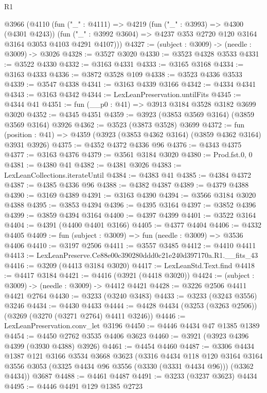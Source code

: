 \begin{lexlean}{R1}
\begin{coremodule}
  @3966
    (@4110
      (fun ("_" : @4111) =>
      @4219
        (fun ("_" : @3993) => @4300 (@4301 @4243))
        (fun ("_" : @3992 @3604) => @4237 @353 @2720 @120 @3164 @3164 @3053 @4103 @4291 @4107)))
@4327 := (subject : @3009) -> (needle : @3009) -> @3026
@4328 := @3527 @3020
@4330 := @3523 @4328 @3533
@4331 := @3522 @4330
@4332 := @3163 @4331
@4333 := @3165 @3168
@4334 := @3163 @4333
@4336 := @3872 @3528 @109
@4338 := @3523 @4336 @3533
@4339 := @3547 @4338
@4341 := @3163 @4339 @3166
@4342 := @4334 @4341
@4343 := @3163 @4342
@4344 := LexLeanPreservation.untilFits
@4345 := @4344 @41
@4351 := fun (__p0 : @41) => @3913 @3184 @3528 @3182 @3699 @3020
@4352 := @4345 @4351
@4359 := @3923 (@3853 @3569 @3164) (@3859 @3569 @3164) @3926
@4362 := @3523 (@3873 @3528) @3699
@4372 := fun (position : @41) => @4359 (@3923 (@3853 @4362 @3164) (@3859 @4362 @3164) @3931 @3926)
@4375 := @4352 @4372 @4336 @96
@4376 := @4343 @4375
@4377 := @3163 @4376
@4379 := @3561 @3184 @3020
@4380 := Prod.fst.{0, 0}
@4381 := @4380 @41
@4382 := @4381 @3026
@4383 := LexLeanCollections.iterateUntil
@4384 := @4383 @41
@4385 := @4384 @4372
@4387 := @4385 @4336 @96
@4388 := @4382 @4387
@4389 := @4379 @4388
@4390 := @3169 @4389
@4391 := @3163 @4390
@4394 := @3566 @3184 @3020 @4388
@4395 := @3853 @4394
@4396 := @4395 @3164
@4397 := @3852 @4396
@4399 := @3859 @4394 @3164
@4400 := @4397 @4399
@4401 := @3522 @3164
@4404 := @4391 (@4400 @4401 @3166)
@4405 := @4377 @4404
@4406 := @4332 @4405
@4409 := fun (subject : @3009) => fun (needle : @3009) => @3536 @4406
@4410 := @3197 @2506
@4411 := @3557 @3485
@4412 := @4410 @4411
@4413 := LexLeanPreserve.Ce88e00c390280ddd0c21e240d397170a.R1.__fits_43
@4416 := @3209 (@4413 @3184 @3020)
@4417 := LexLeanStd.Text.find
@4418 := @4417 @3184
@4421 := @4416 (@3921 (@4418 @3020))
@4424 := (subject : @3009) -> (needle : @3009) -> @4412 @4421
@4428 := @3226 @2506 @4411 @4421 @2764
@4430 := @3233 (@3240 @3483)
@4433 := @3233 (@3243 @3556) @3246
@4434 := @4430 @4433
@4444 := @4428 @4434 (@3253 (@3263 @2506)) (@3269 (@3270 (@3271 @2764) @4411 @3246))
@4446 := LexLeanPreservation.conv_let @3196
@4450 := @4446 @4434 @47 @1385 @1389
@4454 := @4450 @2762 @3535 @4406 @3623
@4460 := @3921 (@3923 @4396 @4399 (@3930 @4388) @3926)
@4461 := @4454 @4460
@4487 := @3306
    @4434
    @1387
    @121
    @3166
    @3534
    @3668
    @3623
    (@3316
      @4434
      @118
      @120
      @3164
      @3164
      @3556
      @3053
      (@3325 @4434 @96 @3556 (@3330 (@3331 @4434 @96)))
      (@3362 @4434))
    @3687
@4488 := @4461 @4487
@4491 := @3233 (@3237 @3623) @4434
@4495 := @4446 @4491 @129 @1385 @2723

\end{coremodule}
\end{lexlean}
